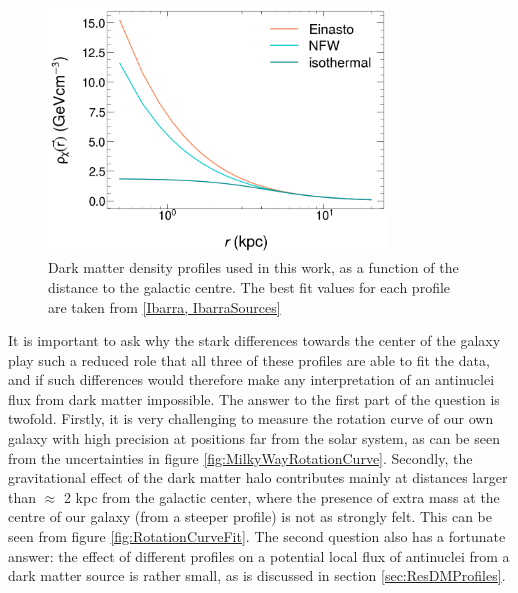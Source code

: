 \begin{figure}[hbtp]
    \centering
    \includegraphics[width=0.8\textwidth]{figures/DMProfiles_distributions_log.png}
    \caption{Dark matter density profiles used in this work, as a function of the distance to the galactic centre. The best fit values for each profile are taken from \ref{Ibarra, IbarraSources}}
    \label{fig:DMProfiles}
\end{figure}

It is important to ask why the stark differences towards the center of the galaxy play such a reduced role that all three of these profiles are able to fit the data, and if such differences would therefore make any interpretation of an antinuclei flux from dark matter impossible. The answer to the first part of the question is twofold. Firstly, it is very challenging to measure the rotation curve of our own galaxy with high precision at positions far from the solar system, as can be seen from the uncertainties in figure \ref{fig:MilkyWayRotationCurve}. Secondly, the gravitational effect of the dark matter halo contributes mainly at distances larger than $\approx$ 2 kpc from the galactic center, where the presence of extra mass at the centre of our galaxy (from a steeper profile) is not as strongly felt. This can be seen from figure \ref{fig:RotationCurveFit}. The second question also has a fortunate answer: the effect of different profiles on a potential local flux of antinuclei from a dark matter source is rather small, as is discussed in section \ref{sec:ResDMProfiles}. 

